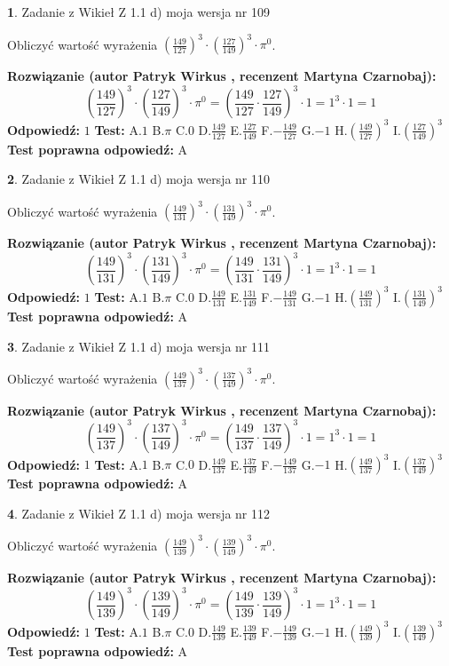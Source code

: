 \documentclass[12pt, a4paper]{article}
\theoremstyle{definition} %
\newtheorem{zad}{}
\newcommand{\zadStart}[1]{\begin{zad}#1\newline}
\newcommand{\zadStop}{\end{zad}}
\newcommand{\rozwStart}[2]{\noindent \textbf{Rozwiązanie (autor #1 , recenzent #2): }\newline}
\newcommand{\rozwStop}{\newline}
\newcommand{\odpStart}{\noindent \textbf{Odpowiedź:}\newline}
\newcommand{\odpStop}{\newline}
\newcommand{\testStart}{\noindent \textbf{Test:}\newline}
\newcommand{\testStop}{\newline}
\newcommand{\kluczStart}{\noindent \textbf{Test poprawna odpowiedź:}\newline}
\newcommand{\kluczStop}{\newline}
\begin{document}
\zadStart{Zadanie z Wikieł Z 1.1 d) moja wersja nr 109}

Obliczyć wartość wyrażenia $(\frac{149}{127})^{3} \cdot (\frac{127}{149})^{3} \cdot \pi^{0}$.
\zadStop
\rozwStart{Patryk Wirkus}{Martyna Czarnobaj}
$$(\frac{149}{127})^{3} \cdot (\frac{127}{149})^{3} \cdot \pi^{0} = (\frac{149}{127} \cdot \frac{127}{149})^{3} \cdot 1 = 1^{3} \cdot 1 = 1$$
\rozwStop
\odpStart
$1$
\odpStop
\testStart
A.$1$ B.$\pi$ C.$0$ D.$\frac{149}{127}$ E.$\frac{127}{149}$
F.$-\frac{149}{127}$ G.$-1$
H.$(\frac{149}{127})^{3}$
I.$(\frac{127}{149})^{3}$
\testStop
\kluczStart
A
\kluczStop



\zadStart{Zadanie z Wikieł Z 1.1 d) moja wersja nr 110}

Obliczyć wartość wyrażenia $(\frac{149}{131})^{3} \cdot (\frac{131}{149})^{3} \cdot \pi^{0}$.
\zadStop
\rozwStart{Patryk Wirkus}{Martyna Czarnobaj}
$$(\frac{149}{131})^{3} \cdot (\frac{131}{149})^{3} \cdot \pi^{0} = (\frac{149}{131} \cdot \frac{131}{149})^{3} \cdot 1 = 1^{3} \cdot 1 = 1$$
\rozwStop
\odpStart
$1$
\odpStop
\testStart
A.$1$ B.$\pi$ C.$0$ D.$\frac{149}{131}$ E.$\frac{131}{149}$
F.$-\frac{149}{131}$ G.$-1$
H.$(\frac{149}{131})^{3}$
I.$(\frac{131}{149})^{3}$
\testStop
\kluczStart
A
\kluczStop



\zadStart{Zadanie z Wikieł Z 1.1 d) moja wersja nr 111}

Obliczyć wartość wyrażenia $(\frac{149}{137})^{3} \cdot (\frac{137}{149})^{3} \cdot \pi^{0}$.
\zadStop
\rozwStart{Patryk Wirkus}{Martyna Czarnobaj}
$$(\frac{149}{137})^{3} \cdot (\frac{137}{149})^{3} \cdot \pi^{0} = (\frac{149}{137} \cdot \frac{137}{149})^{3} \cdot 1 = 1^{3} \cdot 1 = 1$$
\rozwStop
\odpStart
$1$
\odpStop
\testStart
A.$1$ B.$\pi$ C.$0$ D.$\frac{149}{137}$ E.$\frac{137}{149}$
F.$-\frac{149}{137}$ G.$-1$
H.$(\frac{149}{137})^{3}$
I.$(\frac{137}{149})^{3}$
\testStop
\kluczStart
A
\kluczStop



\zadStart{Zadanie z Wikieł Z 1.1 d) moja wersja nr 112}

Obliczyć wartość wyrażenia $(\frac{149}{139})^{3} \cdot (\frac{139}{149})^{3} \cdot \pi^{0}$.
\zadStop
\rozwStart{Patryk Wirkus}{Martyna Czarnobaj}
$$(\frac{149}{139})^{3} \cdot (\frac{139}{149})^{3} \cdot \pi^{0} = (\frac{149}{139} \cdot \frac{139}{149})^{3} \cdot 1 = 1^{3} \cdot 1 = 1$$
\rozwStop
\odpStart
$1$
\odpStop
\testStart
A.$1$ B.$\pi$ C.$0$ D.$\frac{149}{139}$ E.$\frac{139}{149}$
F.$-\frac{149}{139}$ G.$-1$
H.$(\frac{149}{139})^{3}$
I.$(\frac{139}{149})^{3}$
\testStop
\kluczStart
A
\kluczStop
\end{document}
